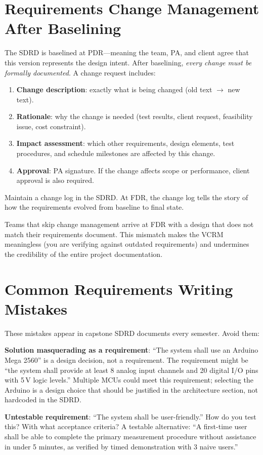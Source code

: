 \section{Requirements Change Management After Baselining}
The SDRD is baselined at PDR---meaning the team, PA, and client agree that this version represents the design intent. After baselining, \emph{every change must be formally documented}. A change request includes:

\begin{enumerate}[nosep,leftmargin=1.5em]
\item \textbf{Change description}: exactly what is being changed (old text $\to$ new text).
\item \textbf{Rationale}: why the change is needed (test results, client request, feasibility issue, cost constraint).
\item \textbf{Impact assessment}: which other requirements, design elements, test procedures, and schedule milestones are affected by this change.
\item \textbf{Approval}: PA signature. If the change affects scope or performance, client approval is also required.
\end{enumerate}

Maintain a change log in the SDRD. At FDR, the change log tells the story of how the requirements evolved from baseline to final state.

Teams that skip change management arrive at FDR with a design that does not match their requirements document. This mismatch makes the VCRM meaningless (you are verifying against outdated requirements) and undermines the credibility of the entire project documentation.

\section{Common Requirements Writing Mistakes}
These mistakes appear in capstone SDRD documents every semester. Avoid them:

\textbf{Solution masquerading as a requirement}: ``The system shall use an Arduino Mega 2560'' is a design decision, not a requirement. The requirement might be ``the system shall provide at least 8 analog input channels and 20 digital I/O pins with 5\,V logic levels.'' Multiple MCUs could meet this requirement; selecting the Arduino is a design choice that should be justified in the architecture section, not hardcoded in the SDRD.

\textbf{Untestable requirement}: ``The system shall be user-friendly.'' How do you test this? With what acceptance criteria? A testable alternative: ``A first-time user shall be able to complete the primary measurement procedure without assistance in under 5 minutes, as verified by timed demonstration with 3 naive users.''

